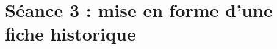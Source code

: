 \newpage

\phantom{rien}


\vfill

\begin{center}\label{modelePage5e2}\end{center}

\vfill

\phantom{rien} 







%
%
%
%

\newpage

\section{Séance 3 : mise en forme d'une fiche historique}\label{ficheTexte5e3}



